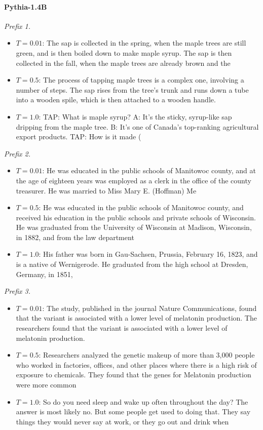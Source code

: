 \paragraph{Pythia-1.4B}
\noindent\textit{Prefix 1.}\begin{itemize}
  \item $T=0.01$: \textcolor{blue!60!black}{The sap is collected in the spring, when the maple trees are still green, and is then boiled down to make maple syrup. The sap is then collected in the fall, when the maple trees are already brown and the}
  \item $T=0.5$: \textcolor{blue!60!black}{The process of tapping maple trees is a complex one, involving a number of steps. The sap rises from the tree's trunk and runs down a tube into a wooden spile, which is then attached to a wooden handle.}
  \item $T=1.0$: \textcolor{blue!60!black}{TAP: What is maple syrup? A: It's the sticky, syrup-like sap dripping from the maple tree. B: It's one of Canada's top-ranking agricultural export products. TAP: How is it made (}
\end{itemize}
\noindent\textit{Prefix 2.}\begin{itemize}
  \item $T=0.01$: \textcolor{blue!60!black}{He was educated in the public schools of Manitowoc county, and at the age of eighteen years was employed as a clerk in the office of the county treasurer. He was married to Miss Mary E. (Hoffman) Me}
  \item $T=0.5$: \textcolor{blue!60!black}{He was educated in the public schools of Manitowoc county, and received his education in the public schools and private schools of Wisconsin. He was graduated from the University of Wisconsin at Madison, Wisconsin, in 1882, and from the law department}
  \item $T=1.0$: \textcolor{blue!60!black}{His father was born in Gau-Sachsen, Prussia, February 16, 1823, and is a native of Wernigerode. He graduated from the high school at Dresden, Germany, in 1851,}
\end{itemize}
\noindent\textit{Prefix 3.}\begin{itemize}
  \item $T=0.01$: \textcolor{blue!60!black}{The study, published in the journal Nature Communications, found that the variant is associated with a lower level of melatonin production. The researchers found that the variant is associated with a lower level of melatonin production.}
  \item $T=0.5$: \textcolor{blue!60!black}{Researchers analyzed the genetic makeup of more than 3,000 people who worked in factories, offices, and other places where there is a high risk of exposure to chemicals. They found that the genes for Melatonin production were more common}
  \item $T=1.0$: \textcolor{blue!60!black}{So do you need sleep and wake up often throughout the day? The answer is most likely no. But some people get used to doing that. They say things they would never say at work, or they go out and drink when}
\end{itemize}
